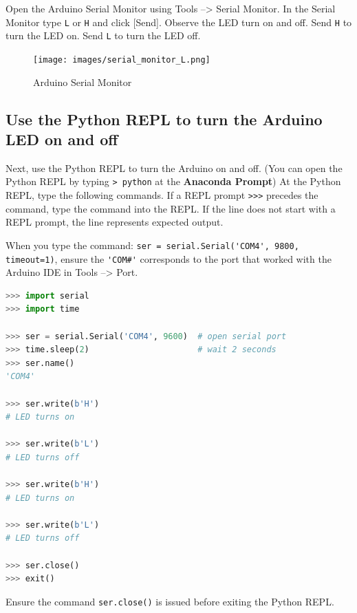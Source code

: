 \documentclass{book}
\begin{document}
    
        Open the Arduino Serial Monitor using Tools --\textgreater{} Serial
Monitor. In the Serial Monitor type \lstinline!L! or \lstinline!H! and
click {[}Send{]}. Observe the LED turn on and off. Send \lstinline!H! to
turn the LED on. Send \lstinline!L! to turn the LED off.

\begin{figure}
\centering
\texttt{[image: images/serial\_monitor\_L.png]}
\caption{Arduino Serial Monitor}
\end{figure}
    




    
        \subsection{Use the Python REPL to turn the Arduino LED on and
off}\label{use-the-python-repl-to-turn-the-arduino-led-on-and-off}
    




    
        Next, use the Python REPL to turn the Arduino on and off. (You can open
the Python REPL by typing \lstinline!> python! at the \textbf{Anaconda
Prompt}) At the Python REPL, type the following commands. If a REPL
prompt \lstinline!>>>! precedes the command, type the command into the
REPL. If the line does not start with a REPL prompt, the line represents
expected output.

When you type the command:
\lstinline!ser = serial.Serial('COM4', 9800, timeout=1)!, ensure the
\lstinline!'COM#'! corresponds to the port that worked with the Arduino
IDE in Tools --\textgreater{} Port.

\begin{lstlisting}[language=Python]
>>> import serial
>>> import time

>>> ser = serial.Serial('COM4', 9600)  # open serial port
>>> time.sleep(2)                      # wait 2 seconds
>>> ser.name()
'COM4'

>>> ser.write(b'H')
# LED turns on

>>> ser.write(b'L')
# LED turns off

>>> ser.write(b'H')
# LED turns on

>>> ser.write(b'L')
# LED turns off

>>> ser.close()
>>> exit()
\end{lstlisting}

Ensure the command \lstinline!ser.close()! is issued before exiting the
Python REPL.
    
\end{document}
